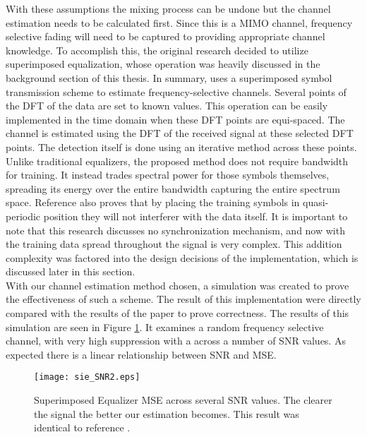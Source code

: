 With these assumptions the mixing process can be undone but the channel estimation needs to be calculated first.  Since this is a MIMO channel, frequency selective fading will need to be captured to providing appropriate channel knowledge.  To accomplish this, the original research decided to utilize superimposed equalization, whose operation was heavily discussed in the background section of this thesis.  In summary, \cite{Ghogho} uses a superimposed symbol transmission scheme to estimate frequency-selective channels. Several points of the DFT of the data are set to known values. This operation can be easily implemented in the time domain when these DFT points are equi-spaced. The channel is estimated using the DFT of the received signal at these selected DFT points. The detection itself is done using an iterative method across these points.  Unlike traditional equalizers, the proposed method does not require bandwidth for training.  It instead trades spectral power for those symbols themselves, spreading its energy over the entire bandwidth capturing the entire spectrum space.  Reference \cite{Ghogho} also proves that by placing the training symbols in quasi-periodic position they will not interferer with the data itself.  It is important to note that this research discusses no synchronization mechanism, and now with the training data spread throughout the signal is very complex.  This addition complexity was factored into the design decisions of the implementation, which is discussed later in this section.\\

With our channel estimation method chosen, a simulation was created to prove the effectiveness of such a scheme.  The result of this implementation were directly compared with the results of the paper to prove correctness.  %
The results of this simulation are seen in Figure \ref{sie}.  It examines a random frequency selective channel, with very high suppression with a across a number of SNR values.  As expected there is a linear relationship between SNR and MSE.\\  %

\begin{figure}[!ht]\label{sie}
\centering
\texttt{[image: sie\_SNR2.eps]}
\caption{Superimposed Equalizer MSE across several SNR values.  The clearer the signal the better our estimation becomes.  This result was identical to reference \cite{Ghogho}.}
\end{figure}

